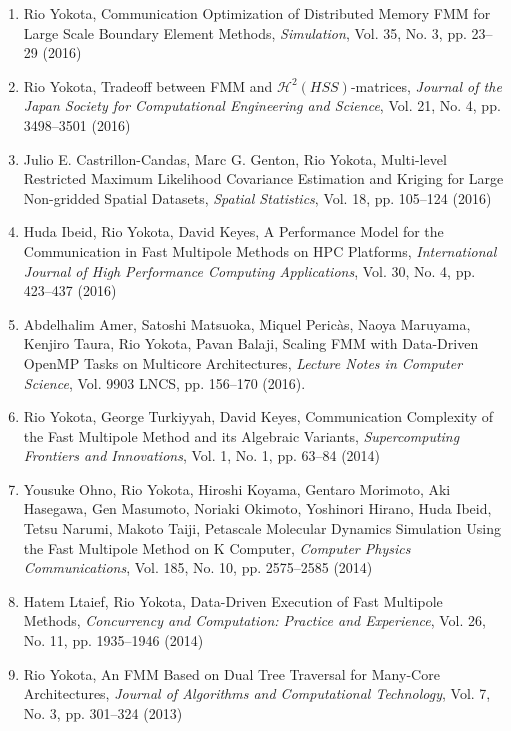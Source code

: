 \documentclass[margin,line]{cv}
\begin{document}
\begin{resume}
\begin{enumerate}
\item Rio Yokota, Communication Optimization of Distributed Memory FMM for Large Scale Boundary Element Methods, {\it Simulation}, Vol. 35, No. 3, pp. 23--29 (2016)

\item Rio Yokota, Tradeoff between FMM and $\mathcal{H}^2 (HSS)$-matrices, {\it Journal of the Japan Society for Computational Engineering and Science}, Vol. 21, No. 4, pp. 3498--3501 (2016)

\item Julio E. Castrillon-Candas, Marc G. Genton, Rio Yokota, Multi-level Restricted Maximum Likelihood Covariance Estimation and Kriging for Large Non-gridded Spatial Datasets, {\it Spatial Statistics}, Vol. 18, pp. 105--124 (2016)

\item Huda Ibeid, Rio Yokota, David Keyes, A Performance Model for the Communication in Fast Multipole Methods on HPC Platforms, {\it International Journal of High Performance Computing Applications}, Vol. 30, No. 4, pp. 423--437 (2016)

\item Abdelhalim Amer, Satoshi Matsuoka, Miquel Peric\`as, Naoya Maruyama, Kenjiro Taura, Rio Yokota, Pavan Balaji, Scaling FMM with Data-Driven OpenMP Tasks on Multicore Architectures, {\it Lecture Notes in Computer Science}, Vol. 9903 LNCS, pp. 156--170 (2016).

\item Rio Yokota, George Turkiyyah, David Keyes, Communication Complexity of the Fast Multipole Method and its Algebraic Variants, {\it Supercomputing Frontiers and Innovations}, Vol. 1, No. 1, pp. 63--84 (2014)

\item Yousuke Ohno, Rio Yokota, Hiroshi Koyama, Gentaro Morimoto, Aki Hasegawa, Gen Masumoto, Noriaki Okimoto, Yoshinori Hirano, Huda Ibeid, Tetsu Narumi, Makoto Taiji, Petascale Molecular Dynamics Simulation Using the Fast Multipole Method on K Computer, {\it Computer Physics Communications}, Vol. 185, No. 10, pp. 2575--2585 (2014)

\item Hatem Ltaief, Rio Yokota, Data-Driven Execution of Fast Multipole Methods, {\it Concurrency and Computation: Practice and Experience}, Vol. 26, No. 11, pp. 1935--1946 (2014)

\item Rio Yokota, An FMM Based on Dual Tree Traversal for Many-Core Architectures,  {\it Journal of Algorithms and Computational Technology}, Vol. 7, No. 3, pp. 301--324 (2013)


\end{enumerate}
\end{resume}
\end{document}
